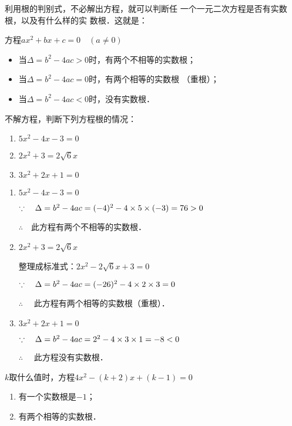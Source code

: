 利用根的判别式，不必解出方程，就可以判断任
一个一元二次方程是否有实数根，以及有什么样的实
数根．这就是：
\begin{blk}{}
    方程$ax^2+bx+c=0\quad (a\ne 0)$
    \begin{itemize}
        \item 当$\Delta =b^2-4ac>0$时，有两个不相等的实数根；
        \item 当$\Delta=b^2-4ac=0$时，有两个相等的实数根
        （重根）；
        \item 当$\Delta=b^2-4ac<0$时，没有实数根．
    \end{itemize}
\end{blk}

\begin{example}
    不解方程，判断下列方程根的情况：
    \begin{enumerate}
        \item $5x^2-4x-3=0$
        \item $2x^2+3=2\sqrt{6}x$
        \item $3x^2+2x+1=0$
    \end{enumerate}
\end{example}

\begin{solution}
\begin{enumerate}
    \item $5x^2-4x-3=0$
    
    $\because\quad \Delta =b^2-4ac=(-4)^2-4\times5 \times(-3)=76>0$

   $\therefore\quad $此方程有两个不相等的实数根．
   \item $2x^2+3=2\sqrt{6}x$
   
    整理成标准式：$2x^2-2\sqrt{6}x+3=0$

    $\because\quad \Delta=b^2-4ac=(-26)^2-4\times2\times3=0$

 $\therefore\quad $   此方程有两个相等的实数根（重根）．

\item $3x^2+2x+1=0$
    
$\because\quad \Delta=b^2-4ac=2^2-4\times3\times1=-8<0$

$\therefore\quad $   此方程没有实数根．
\end{enumerate}
\end{solution}

\begin{example}
    $k$取什么值时，方程$4x^2-(k+2)x+(k-1)=0$
    \begin{enumerate}
        \item 有一个实数根是$-1$；
        \item 有两个相等的实数根．
    \end{enumerate}
\end{example}

